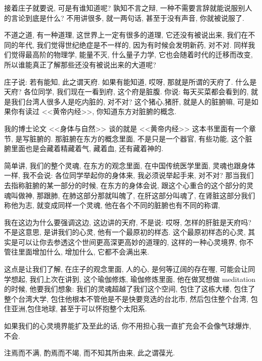 \documentclass[11pt]{article}
\begin{document}
\vspace{-0.5cm}

接着庄子就要说, 可是有谁知道呢? {\color{blue} 孰知不言之辩}, 一种不需要言辞就能说服别人的言论到底是什么? 不用讲很多, 就一两句话, 甚至于没有声音, 你就被说服了.

{\color{blue}不道之道}, 有一种道理, 这世界上一定有很多的道理, 它还没有被说出来, 我们在不同的年代, 我们觉得世纪绝症是不一样的, 因为有时候会发明新药, 对不对. 同样我们觉得最高阶的物理学, 能量不灭, 什么量子力学, 它也会随着时代的迁移而改变, 所以谁能真正了解那些还没有被说出来的大道呢? 

庄子说: {\color{blue} 若有能知, 此之谓天府}. 如果有能知道, 哎呀, 那就是所谓的天府了.  什么是天府? 各位同学, 我们现在一看到府, 这个府是脏腹. 你说: 每天买菜都会看到的, 就是我们台湾人很多人是吃内脏的, 对不对? 这个猪心,猪肝, 就是人的脏腑嘛, 可是如果你有读过 <<黄帝内经>>, 你知道东方对脏腑的概念. 

我的博士论文 <<身体与自然>> 谈的就是 <<黄帝内经>> 这本书里面有一个章节, 是写脏腑的. 那脏腑在东方的概念里面, 不是只是一个器官, 有些功能, 这个脏腑里面也是会藏着精藏着气, 藏着血, 还有藏着神的.

简单讲, 我们的整个灵魂, 在东方的观念里面, 在中国传统医学里面, 灵魂也跟身体一样, 我不会说: 各位同学举起你的身体来, 我必须说举起手来, 对不对? 那当我们去指称脏腑的某一部分的时候, 在东方的身体会说, 跟这个心重合的这个部分的灵魂叫做神, 那跟肺, 在肺这部分那就叫魄了, 在肝这部分叫魂了, 在肾脏这部分我们称他为志, 就变成同样一个灵魂, 他在各个不同的脏腑也有不同的称谓, 

我在这边为什么要强调这边, 这边讲的天府, 不是说: 哎呀, 怎样的肝脏是天府吗? 不是这意思, 是讲我们的心灵, 他有一个最原初的样态. 这个最原初样态的心灵, 其实是可以让你去参透这个世间更高深更高妙的道理的, 这样的一种心灵境界, 你不管往里面增加什么, 增加什么, 它都不会满出来. 

这点是让我们了解, 在庄子的观念里面, 人的心, 是何等辽阔的存在喔, 可能会让同学想起, 我们上次在讲到, 这个瑜伽修炼, 瑜伽修炼里面, 他在做冥想做 meditation 的时候, 他要我们想象: 我们的灵魂超越了我们这个空间, 包住了这栋大楼, 包住了整个台湾大学, 包住他根本不管他是不是快要竞选的台北市, 然后包住整个台湾, 包住亚洲,包住地球, 甚至于可以怀抱整个太阳系.

如果我们的心灵境界能扩及至此的话, 你不用担心我一直扩充会不会像气球爆炸, 不会.

\begin{center}
	{\color{magenta} 注焉而不满, 酌焉而不竭, 而不知其所由来, 此之谓葆光.}
\end{center}
\end{document}
